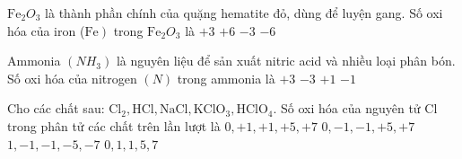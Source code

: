 \begin{ex}
	$\mathrm{Fe}_2O_3$ là thành phần chính của quặng hematite đỏ, dùng để luyện gang. Số oxi hóa của iron ($\left.\mathrm{Fe}\right)$ trong $\mathrm{Fe}_2O_3$ là
	\choice
	{\True $+3$}
	{$+6$}
	{$-3$}
	{$-6$}
\end{ex}
\begin{ex}
	Ammonia $\left(NH_3\right)$ là nguyên liệu để sản xuất nitric acid và nhiều loại phân bón. Số oxi hóa của nitrogen $(N)$ trong ammonia là
	\choice
	{$+3$}
	{\True $-3$}
	{$+1$}
	{$-1$}
\end{ex}
\begin{ex}
	Cho các chất sau: $\mathrm{Cl}_2, \mathrm{HCl}, \mathrm{NaCl}, \mathrm{KClO}_3, \mathrm{HClO}_4$. Số oxi hóa của nguyên tử $\mathrm{Cl}$ trong phân tử các chất trên lần lượt là
	\choice
	{$0,+1,+1,+5,+7$}
	{\True $0,-1,-1,+5,+7$}
	{$1,-1,-1,-5,-7$}
	{$0,1,1,5,7$}
\end{ex}


